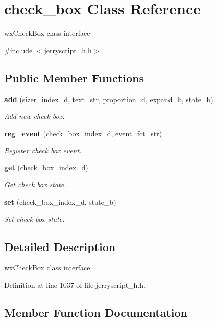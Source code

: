 \section{check\+\_\+box Class Reference}
\label{classcheck__box}


wx\+Check\+Box class interface  




{\ttfamily \#include $<$jerryscript\+\_\+h.\+h$>$}

\subsection*{Public Member Functions}
\begin{DoxyCompactItemize}
\item 
\textbf{ add} (sizer\+\_\+index\+\_\+d, text\+\_\+str, proportion\+\_\+d, expand\+\_\+b, state\+\_\+b)
\begin{DoxyCompactList}\small\item\em Add new check box. \end{DoxyCompactList}\item 
\textbf{ reg\+\_\+event} (check\+\_\+box\+\_\+index\+\_\+d, event\+\_\+fct\+\_\+str)
\begin{DoxyCompactList}\small\item\em Register check box event. \end{DoxyCompactList}\item 
\textbf{ get} (check\+\_\+box\+\_\+index\+\_\+d)
\begin{DoxyCompactList}\small\item\em Get check box state. \end{DoxyCompactList}\item 
\textbf{ set} (check\+\_\+box\+\_\+index\+\_\+d, state\+\_\+b)
\begin{DoxyCompactList}\small\item\em Set check box state. \end{DoxyCompactList}\end{DoxyCompactItemize}


\subsection{Detailed Description}
wx\+Check\+Box class interface 

Definition at line 1037 of file jerryscript\+\_\+h.\+h.



\subsection{Member Function Documentation}
\mbox{\label{classcheck__box_afae13d57400c74b794bfb755e2eaca0b}} 
